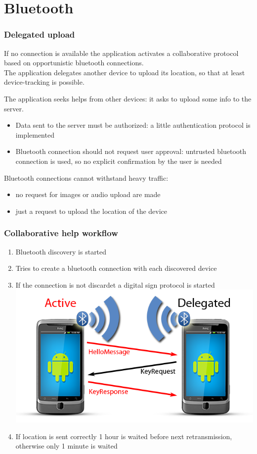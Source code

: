 \documentclass{beamer}
\begin{document}
\section{Bluetooth}
\begin{frame}
\frametitle{Delegated upload}
\begin{block}{}
If no connection is available the application activates a collaborative protocol based on opportunistic bluetooth connections.\\
The application delegates another device to upload its location, so that at least device-tracking is possible.
\end{block}
The application seeks helps from other devices: it asks to upload some info to the server.
\begin{itemize}
  \item Data sent to the server must be authorized: a little authentication protocol is implemented
  \item Bluetooth connection should not request user approval: untrusted bluetooth connection is used, so no explicit confirmation by the user is needed
\end{itemize}
Bluetooth connections cannot withstand heavy traffic:
\begin{itemize}
  \item no request for images or audio upload are made
  \item just a request to upload the location of the device
\end{itemize}
\end{frame}

\begin{frame}
\frametitle{Collaborative help workflow}
\begin{enumerate}
  \item Bluetooth discovery is started
  \item Tries to create a bluetooth connection with each discovered device
  \item If the connection is not discardet a digital sign protocol is started
  \includegraphics[scale=.2]{./../ipermediali/img/bluetooth.png}
  \item If location is sent correctly 1 hour is waited before next retransmission, otherwise only 1 minute is waited
\end{enumerate}
\end{frame}
\end{document}
